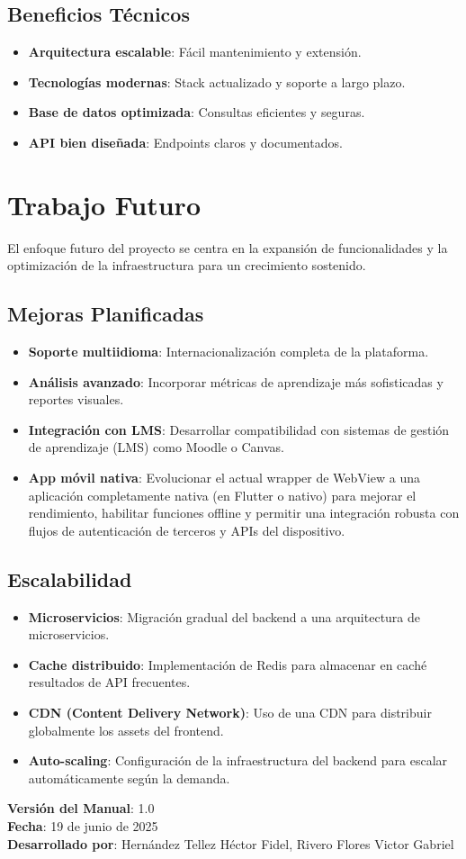 \documentclass[12pt,a4paper]{report}
\begin{document}
\subsection{Beneficios Técnicos}
\begin{itemize}
    \item \textbf{Arquitectura escalable}: Fácil mantenimiento y extensión.
    \item \textbf{Tecnologías modernas}: Stack actualizado y soporte a largo plazo.
    \item \textbf{Base de datos optimizada}: Consultas eficientes y seguras.
    \item \textbf{API bien diseñada}: Endpoints claros y documentados.
\end{itemize}

\section{Trabajo Futuro}

El enfoque futuro del proyecto se centra en la expansión de funcionalidades y la optimización de la infraestructura para un crecimiento sostenido.

\subsection{Mejoras Planificadas}
\begin{itemize}
    \item \textbf{Soporte multiidioma}: Internacionalización completa de la plataforma.
    \item \textbf{Análisis avanzado}: Incorporar métricas de aprendizaje más sofisticadas y reportes visuales.
    \item \textbf{Integración con LMS}: Desarrollar compatibilidad con sistemas de gestión de aprendizaje (LMS) como Moodle o Canvas.
    \item \textbf{App móvil nativa}: Evolucionar el actual wrapper de WebView a una aplicación completamente nativa (en Flutter o nativo) para mejorar el rendimiento, habilitar funciones offline y permitir una integración robusta con flujos de autenticación de terceros y APIs del dispositivo.
\end{itemize}

\subsection{Escalabilidad}
\begin{itemize}
    \item \textbf{Microservicios}: Migración gradual del backend a una arquitectura de microservicios.
    \item \textbf{Cache distribuido}: Implementación de Redis para almacenar en caché resultados de API frecuentes.
    \item \textbf{CDN (Content Delivery Network)}: Uso de una CDN para distribuir globalmente los assets del frontend.
    \item \textbf{Auto-scaling}: Configuración de la infraestructura del backend para escalar automáticamente según la demanda.
\end{itemize}

\vspace{2cm}

\noindent\textbf{Versión del Manual}: 1.0\\
\textbf{Fecha}: 19 de junio de 2025\\
\textbf{Desarrollado por}: Hernández Tellez Héctor Fidel, Rivero Flores Victor Gabriel
\end{document}
